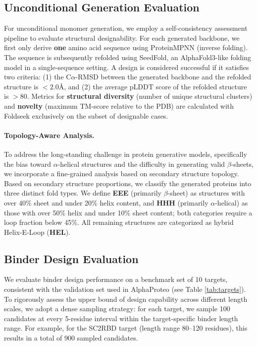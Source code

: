 \documentclass[]{bytedance_seed}
\begin{document}
\subsection{Unconditional Generation Evaluation}
For unconditional monomer generation, we employ a self-consistency assessment pipeline to evaluate structural designability. For each generated backbone, we first only derive \textbf{one} amino acid sequence using ProteinMPNN (inverse folding). The sequence is subsequently refolded using SeedFold, an AlphaFold3-like folding model in a single-sequence setting. A design is considered successful if it satisfies two criteria: 
(1) the C$\alpha$-RMSD between the generated backbone and the refolded structure is $< 2.0$\AA, and 
(2) the average pLDDT score of the refolded structure is $> 80$. 
Metrics for \textbf{structural diversity} (number of unique structural clusters) and \textbf{novelty} (maximum TM-score relative to the PDB) are calculated with Foldseek \cite{vankempenFastAccurateProtein2024} exclusively on the subset of designable cases.

\paragraph{Topology-Aware Analysis.}
To address the long-standing challenge in protein generative models, specifically the bias toward $\alpha$-helical structures and the difficulty in generating valid $\beta$-sheets, we incorporate a fine-grained analysis based on secondary structure topology. Based on secondary structure proportions, we classify the generated proteins into three distinct fold types. We define \textbf{EEE} (primarily $\beta$-sheet) as structures with over 40\% sheet and under 20\% helix content, and \textbf{HHH} (primarily $\alpha$-helical) as those with over 50\% helix and under 10\% sheet content; both categories require a loop fraction below 45\%. All remaining structures are categorized as hybrid Helix-E-Loop (\textbf{HEL}).

\subsection{Binder Design Evaluation}
We evaluate binder design performance on a benchmark set of 10 targets, consistent with the validation set used in AlphaProteo (see Table \ref{tab:targets}). To rigorously assess the upper bound of design capability across different length scales, we adopt a dense sampling strategy: for each target, we sample 100 candidates at every 5-residue interval within the target-specific binder length range. For example, for the SC2RBD target (length range 80--120 residues), this results in a total of 900 sampled candidates.
\end{document}
